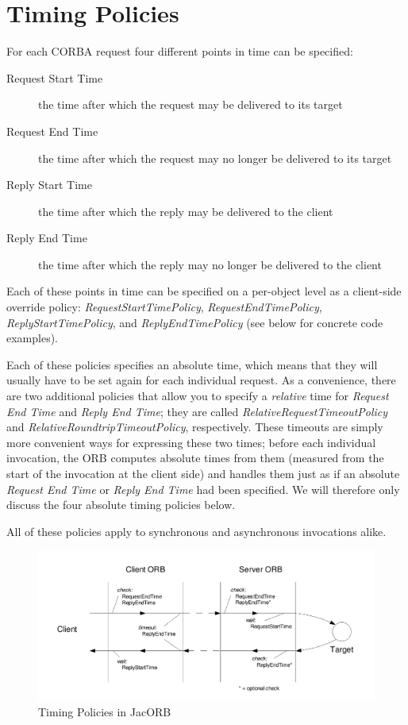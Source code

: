 \section{Timing Policies}

For each CORBA request four different points in time can be specified:

\begin{description}
\item[Request Start Time] the time after which the request may be
  delivered to its target
\item[Request End Time] the time after which the request may no longer
  be delivered to its target
\item[Reply Start Time] the time after which the reply may be delivered
  to the client
\item[Reply End Time] the time after which the reply may no longer be
  delivered to the client
\end{description}

Each of these points in time can be specified on a per-object level as
a client-side override policy: \mbox{\emph{RequestStartTimePolicy}},
\emph{RequestEndTimePolicy}, \emph{ReplyStartTimePolicy}, and
\emph{ReplyEndTimePolicy} (see below for concrete code examples).

Each of these policies specifies an absolute time, which means that
they will usually have to be set again for each individual
request.  As a convenience, there are two additional policies that
allow you to specify a \emph{relative} time for \emph{Request End
Time} and \emph{Reply End Time}; they are called
\emph{RelativeRequestTimeoutPolicy} and
\emph{RelativeRoundtripTimeoutPolicy}, respectively.  These timeouts
are simply more convenient ways for expressing these two times;
before each individual invocation, the ORB computes absolute times
from them (measured from the start of the invocation at the client
side) and handles them just as if an absolute \emph{Request End Time}
or \emph{Reply End Time} had been specified.  We will therefore only
discuss the four absolute timing policies below.

All of these policies apply to synchronous and asynchronous
invocations alike.

\begin{figure}[htb]
  \begin{center}
    \includegraphics[width=16cm]{QoS/Timing}
  \end{center}
\caption{Timing Policies in JacORB}
\label{fig:timing}
\end{figure}


